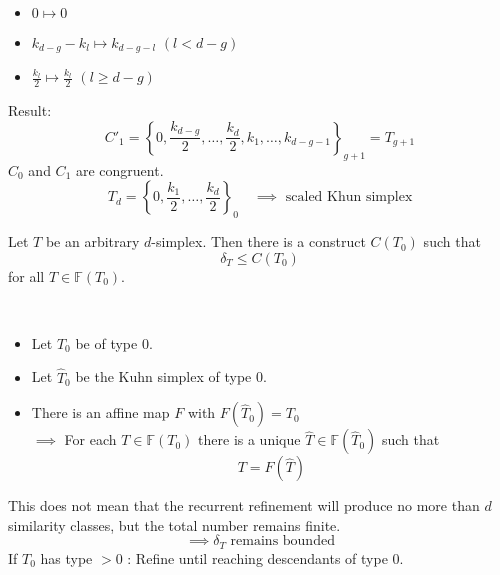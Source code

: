 \begin{proof_}
\begin{enumerate}
\begin{itemize}
				\item $0 \mapsto 0$
				\item $k_{d-g}-k_{l} \mapsto k_{d-g-l}$ $(l< d-g)$
				\item $\frac{k_{l}}{2}\mapsto \frac{k_{l}}{2}$ $(l \geq d-g)$
			\end{itemize}
	\end{enumerate}
	Result:
	\begin{equation*}
		C'_{1}= \left\{ 0, \frac{k_{d-g}}{2},\dots ,\frac{k_{d}}{2},k_{1},\dots ,k_{d-g-1} \right\}_{g+1} = T_{g+1}
	\end{equation*}
	$C_{0}$ and $C_{1}$ are congruent.
	\begin{equation*}
		T_{d}= \left\{ 0, \frac{k_{1}}{2},\dots ,\frac{k_{d}}{2} \right\}_{0} \quad \implies \text{ scaled Khun simplex}
	\end{equation*}
\end{proof_}
\begin{theorem}
	Let $T$ be an arbitrary $d$-simplex. Then there is a construct $C(T_{0})$ such that
	\begin{equation*}
		\delta_{T} \leq C(T_{0})
	\end{equation*}
	for all $T \in \mathbb{F}(T_{0})$.
\end{theorem}
\begin{proof_}\
	\begin{itemize}
		\item Let $T_{0}$ be of type 0.
		\item Let $\hat{T}_{0}$ be the Kuhn simplex of type 0.
		\item There is an affine map $F$ with $F(\hat{T}_{0})=T_{0}$ \\
			$\implies$ For each $T \in \mathbb{F}(T_{0})$ there is a unique $\hat{T} \in \mathbb{F}(\hat{T}_{0})$ such that
			\begin{equation*}
				T = F(\hat{T})
			\end{equation*}
			
	\end{itemize}
	This does not mean that the recurrent refinement will produce no more than $d$ similarity classes, but the total number remains finite.
	 \begin{equation*}
		 \implies \delta_{T} \text{ remains bounded}
	\end{equation*}
	If $T_{0}$ has type $>0$ : Refine until reaching descendants of type $0$.
\end{proof_}



